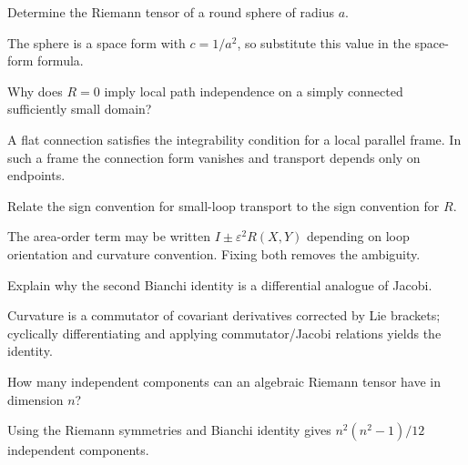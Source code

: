 \begin{problem}\label{prob:vii26-08}
Determine the Riemann tensor of a round sphere of radius \(a\).
\end{problem}
\begin{solution}
The sphere is a space form with \(c=1/a^2\), so substitute this value in the space-form formula.
\end{solution}

\begin{problem}\label{prob:vii26-09}
Why does \(R=0\) imply local path independence on a simply connected sufficiently small domain?
\end{problem}
\begin{solution}
A flat connection satisfies the integrability condition for a local parallel frame. In such a frame the connection form vanishes and transport depends only on endpoints.
\end{solution}

\begin{problem}\label{prob:vii26-10}
Relate the sign convention for small-loop transport to the sign convention for \(R\).
\end{problem}
\begin{solution}
The area-order term may be written \(I\pm\varepsilon^2R(X,Y)\) depending on loop orientation and curvature convention. Fixing both removes the ambiguity.
\end{solution}

\begin{problem}\label{prob:vii26-11}
Explain why the second Bianchi identity is a differential analogue of Jacobi.
\end{problem}
\begin{solution}
Curvature is a commutator of covariant derivatives corrected by Lie brackets; cyclically differentiating and applying commutator/Jacobi relations yields the identity.
\end{solution}

\begin{problem}\label{prob:vii26-12}
How many independent components can an algebraic Riemann tensor have in dimension \(n\)?
\end{problem}
\begin{solution}
Using the Riemann symmetries and Bianchi identity gives \(n^2(n^2-1)/12\) independent components.
\end{solution}

